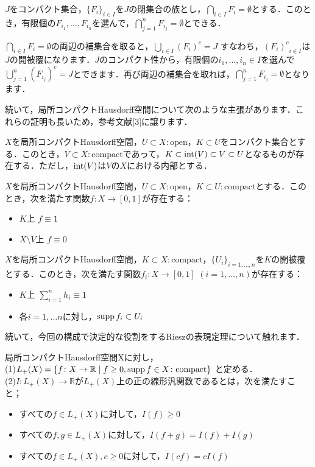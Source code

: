 \begin{ylem}\label{4}
$J$をコンパクト集合，$\{ F_i \}_{i \in I}$を$J$の閉集合の族とし，$\bigcap_{i \in I}F_i = \emptyset$とする．このとき，有限個の$F_{i_1}, \ldots , F_{i_n}$を選んで，$\bigcap_{j=1}^{n}F_{i_j} = \emptyset$とできる．
\end{ylem}
\begin{Proof}
$\bigcap_{i \in I}F_i = \emptyset$の両辺の補集合を取ると，$\bigcup_{i \in I}(F_i)^{c} = J$ すなわち，${(F_i)^{c}}_{i \in I}$は$J$の開被覆になります．$J$のコンパクト性から，有限個の$i_1, \ldots , i_n \in I$を選んで$\bigcup_{j=1}^{n}(F_{i_j})^{c} = J$とできます．再び両辺の補集合を取れば，$\bigcap_{j=1}^{n}F_{i_j} = \emptyset$となります．
\end{Proof}
続いて，局所コンパクトHausdorff空間について次のような主張があります．これらの証明も長いため，参考文献[3]に譲ります．
\begin{ythm}\label{5}
$X$を局所コンパクトHausdorff空間，$U \subset X \colon \mathrm{open}$，$K \subset U$をコンパクト集合とする．このとき，$V \subset X :\mathrm{compact}$であって，$K \subset \operatorname{int}(V) \subset V \subset U$となるものが存在する．ただし，$\operatorname{int}(V)$は$V$の$X$における内部とする．
\end{ythm}
\begin{ythm}[Urysohnの補題]\label{6}
$X$を局所コンパクトHausdorff空間，$U \subset X \colon \mathrm{open}$，$K \subset U \colon \mathrm{compact}$とする．このとき，次を満たす関数$f \colon X \to [0, 1]$が存在する：
\begin{itemize}
 \item $K$上 $f \equiv 1$
 \item $X \setminus V$上 $f \equiv 0$
\end{itemize}
\end{ythm}
\begin{ythm}[1の分割]\label{7}
$X$を局所コンパクトHausdorff空間，$K \subset X \colon \mathrm{compact}$，$\{ U_i \}_{i=1, \ldots , n}$を$K$の開被覆とする．このとき，次を満たす関数$f_i \colon X \to [0,1]$ $(i=1, \ldots , n)$が存在する：
\begin{itemize}
 \item $K$上 $\sum_{i=1}^{n}h_i \equiv 1$
 \item 各$i=1, \ldots n$に対し，$\operatorname{supp} f_i \subset U_i$
\end{itemize}
\end{ythm}
続いて，今回の構成で決定的な役割をするRieszの表現定理について触れます．
\begin{ydefi}\label{8}
局所コンパクトHausdorff空間Xに対し， \\
 (1)$L_{+}(X)= \{ f \colon X \to \mathbb{R} \mid f \ge 0, \operatorname{supp} f \in X \colon \mathrm{compact}\}$ と定める． \\
 (2)$I \colon L_{+}(X) \to \mathbb{R}$が$L_{+}(X)$上の正の線形汎関数であるとは，次を満たすこと；
\begin{itemize}
 \item すべての$f \in L_{+}(X)$に対して，$I(f) \ge 0$
 \item すべての$f,g \in L_{+}(X)$に対して，$I(f+g)=I(f)+I(g)$
 \item すべての$f \in L_{+}(X), c \ge 0$に対して，$I(cf)=cI(f)$
\end{itemize}
\end{ydefi}
